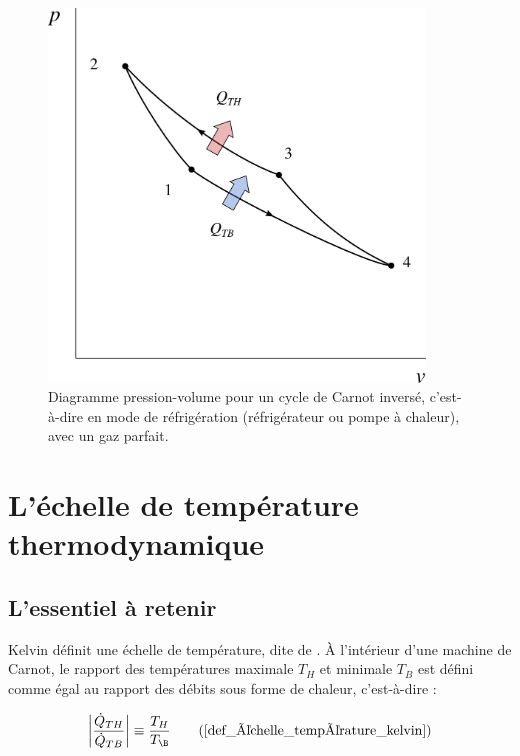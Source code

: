 		\begin{figure}
			\begin{center}
				\includegraphics[width=10cm]{images/carnot_pv_gp_refrigerateur.png}
			\end{center}
			\caption{Diagramme pression-volume pour un cycle de Carnot inversé, c’est-à-dire en mode de réfrigération (réfrigérateur ou pompe à chaleur), avec un gaz parfait.}
			\label{fig_p-v_gp_carnot_inversé}
		\end{figure}





\section{L’échelle de température thermodynamique}


	\subsection{L’essentiel à retenir}
	
		Kelvin définit une échelle de température, dite de . À l’intérieur d’une machine de Carnot, le rapport des températures maximale $T_H$ et minimale $T_B$ est défini comme égal au rapport des débits sous forme de chaleur, c’est-à-dire :
			
		\begin{equation}
			\left| \frac{\dot{Q}_{TH}}{\dot{Q}_{TB}} \right| \equiv  \frac{T_H}{T_\B } \tag{\ref{def_échelle_température_kelvin}}
		\end{equation}
		
